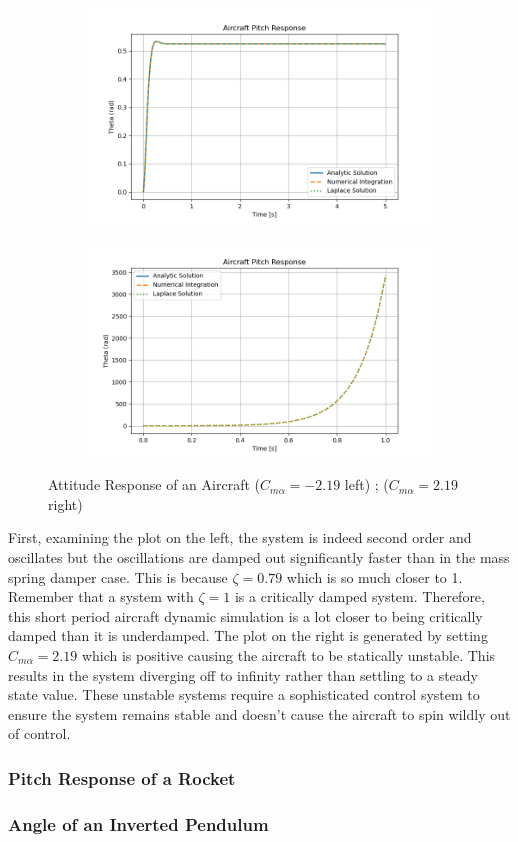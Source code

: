 \begin{figure}[H]
\centering
\begin{subfigure}[b]{0.48\textwidth}
\centering
\includegraphics[width=\linewidth]{Figures/aircraft_response_stable.png}
\end{subfigure}
\hfill
\begin{subfigure}[b]{0.48\textwidth}
\centering
\includegraphics[width=\linewidth]{Figures/aircraft_response_unstable.png}
\end{subfigure}
\caption{Attitude Response of an Aircraft ($C_{m\alpha}=-2.19$ left) ; ($C_{m\alpha}=2.19$ right)}
\label{f:aircraft_response}
\end{figure}
First, examining the plot on the left, the system is indeed second order and oscillates but the oscillations are damped out significantly faster than in the mass spring damper case. This is because $\zeta = 0.79$ which is so much closer to 1. Remember that a system with $\zeta=1$ is a critically damped system. Therefore, this short period aircraft dynamic simulation is a lot closer to being critically damped than it is underdamped. The plot on the right is generated by setting $C_{m\alpha}=2.19$ which is positive causing the aircraft to be statically unstable. This results in the system diverging off to infinity rather than settling to a steady state value. These unstable systems require a sophisticated control system to ensure the system remains stable and doesn't cause the aircraft to spin wildly out of control.

\subsubsection{Pitch Response of a Rocket}

\subsubsection{Angle of an Inverted Pendulum}

